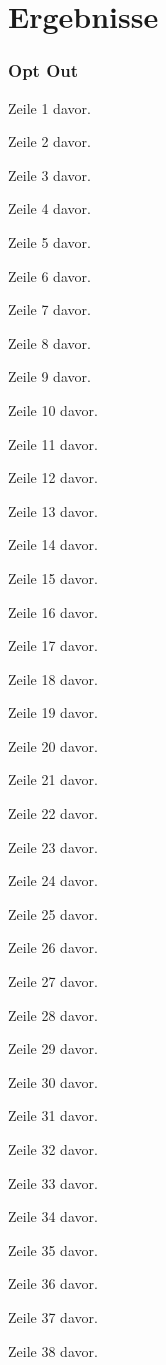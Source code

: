 
\makecoverpages
\maketableofcontents
\makemainmatter
\part{Ergebnisse}
\label{teil:ergebnisse}

\section{Opt Out}
Zeile 1 davor.

Zeile 2 davor.

Zeile 3 davor.

Zeile 4 davor.

Zeile 5 davor.

Zeile 6 davor.

Zeile 7 davor.

Zeile 8 davor.

Zeile 9 davor.

Zeile 10 davor.

Zeile 11 davor.

Zeile 12 davor.

Zeile 13 davor.

Zeile 14 davor.

Zeile 15 davor.

Zeile 16 davor.

Zeile 17 davor.

Zeile 18 davor.

Zeile 19 davor.

Zeile 20 davor.

Zeile 21 davor.

Zeile 22 davor.

Zeile 23 davor.

Zeile 24 davor.

Zeile 25 davor.

Zeile 26 davor.

Zeile 27 davor.

Zeile 28 davor.

Zeile 29 davor.

Zeile 30 davor.

Zeile 31 davor.

Zeile 32 davor.

Zeile 33 davor.

Zeile 34 davor.

Zeile 35 davor.

Zeile 36 davor.

Zeile 37 davor.

Zeile 38 davor.

